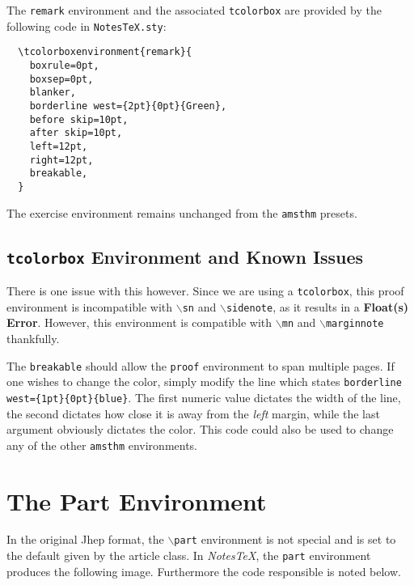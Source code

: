 \begin{remark}
  The \texttt{remark} environment and the associated \texttt{tcolorbox} are provided by the following code in \texttt{NotesTeX.sty}:
  \begin{verbatim}
  \tcolorboxenvironment{remark}{
    boxrule=0pt,
    boxsep=0pt,
    blanker,
    borderline west={2pt}{0pt}{Green},
    before skip=10pt,
    after skip=10pt,
    left=12pt,
    right=12pt,
    breakable,
  }
  \end{verbatim}
\end{remark}
\begin{exercise}
  The exercise environment remains unchanged from the \texttt{amsthm} presets.
\end{exercise}



\subsection{\texttt{tcolorbox} Environment and Known Issues} %
\label{ssub:tcolorbox environments_and_known_issues}

There is one issue with this however. Since we are using a \texttt{tcolorbox}, this proof environment is incompatible with \texttt{$\backslash$sn} and \texttt{$\backslash$sidenote}, as it results in a \textbf{Float(s) Error}. However, this environment is compatible with \texttt{$\backslash$mn} and \texttt{$\backslash$marginnote} thankfully.


The \texttt{breakable} should allow the \texttt{proof} environment to span multiple pages. If one wishes to change the color, simply modify the line which states \texttt{borderline west=\{1pt\}\{0pt\}\{blue\}}. The first numeric value dictates the width of the line, the second dictates how close it is away from the \textit{left} margin, while the last argument obviously dictates the color. This code could also be used to change any of the other \texttt{amsthm} environments.


\section{The Part Environment}\label{sec:part}
In the original Jhep format, the \texttt{$\backslash$part} environment is not special and is set to the default given by the article class. In \textit{NotesTeX}, the \texttt{part} environment produces the following image. Furthermore the code responsible is noted below.\\

